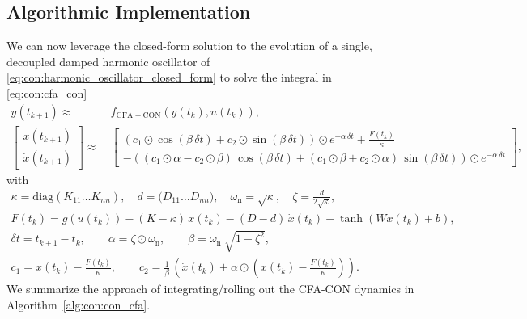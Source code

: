 \subsection{Algorithmic Implementation}
We can now leverage the closed-form solution to the evolution of a single, decoupled damped harmonic oscillator of \eqref{eq:con:harmonic_oscillator_closed_form} to solve the integral in \eqref{eq:con:cfa_con}
\begin{equation}\label{eq:con:cfa:full_con_cfa_dynamics}
\begin{split}
    y(t_{k+1}) \approx& \: f_\mathrm{CFA-CON}(y(t_k), u(t_k)),\\
    \begin{bmatrix}
        x(t_{k+1})\\ \dot{x}(t_{k+1})
    \end{bmatrix} \approx& \: \begin{bmatrix}
        \left ( c_{1} \odot \cos(\beta \, \delta t) +  c_{2} \odot \sin(\beta \, \delta t) \right ) \odot e^{-\alpha \, \delta t} + \frac{F(t_k)}{\kappa}\\
        -\left ( (c_{1} \odot \alpha - c_{2} \odot \beta) \, \cos(\beta \, \delta t) +  (c_{1} \odot \beta + c_{2} \odot \alpha) \, \sin(\beta \, \delta t) \right ) \odot e^{-\alpha \, \delta t}
    \end{bmatrix},
\end{split}
\end{equation}
with
\begin{equation}
\begin{split}
    \kappa = \mathrm{diag}(K_{11} \dots K_{nn}), \quad d = \mathrm(D_{11} \dots D_{nn}), \quad \omega_\mathrm{n} = \sqrt{\kappa}, \quad \zeta = \frac{d}{2 \sqrt{\kappa}},\\
    F(t_k) = g(u(t_k)) - (K - \kappa) \, x(t_k) - (D-d) \, \dot{x}(t_k) - \tanh \left (Wx(t_k)+b \right ),\\
    \delta t = t_{k+1} - t_k, \qquad \alpha = \zeta \odot \omega_\mathrm{n}, \qquad \beta = \omega_\mathrm{n} \: \sqrt{1-\zeta^2},\\
    c_{1} = x(t_k) - \frac{F(t_k)}{\kappa}, \qquad
    c_{2} = \frac{1}{\beta} \, \left ( \dot{x}(t_k) + \alpha \odot \left (x(t_k) - \frac{F(t_k)}{\kappa} \right ) \right ).
\end{split}
\end{equation}
We summarize the approach of integrating/rolling out the \gls{CFA-CON} dynamics in Algorithm~\ref{alg:con:con_cfa}.

